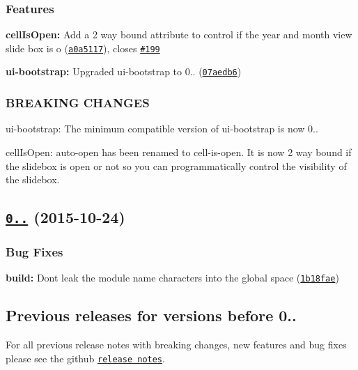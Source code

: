 \subsubsection*{Features}


\begin{DoxyItemize}
\item {\bfseries cell\+Is\+Open\+:} Add a 2 way bound attribute to control if the year and month view slide box is o (\href{https://github.com/mattlewis92/angular-bootstrap-calendar/commit/a0a5117}{\tt a0a5117}), closes \href{https://github.com/mattlewis92/angular-bootstrap-calendar/issues/199}{\tt \#199}
\item {\bfseries ui-\/bootstrap\+:} Upgraded ui-\/bootstrap to 0.. (\href{https://github.com/mattlewis92/angular-bootstrap-calendar/commit/07aedb6}{\tt 07aedb6})
\end{DoxyItemize}

\subsubsection*{B\+R\+E\+A\+K\+I\+NG C\+H\+A\+N\+G\+ES}


\begin{DoxyItemize}
\item ui-\/bootstrap\+: The minimum compatible version of ui-\/bootstrap is now 0..
\item cell\+Is\+Open\+: auto-\/open has been renamed to cell-\/is-\/open. It is now 2 way bound if the slidebox is open or not so you can programmatically control the visibility of the slidebox.
\end{DoxyItemize}

\label{_0.15.5}%
 \subsection*{\href{https://github.com/mattlewis92/angular-bootstrap-calendar/compare/0.15.4...v0.15.5}{\tt 0..} (2015-\/10-\/24)}

\subsubsection*{Bug Fixes}


\begin{DoxyItemize}
\item {\bfseries build\+:} Don\textquotesingle{}t leak the module name characters into the global space (\href{https://github.com/mattlewis92/angular-bootstrap-calendar/commit/1b18fae}{\tt 1b18fae})
\end{DoxyItemize}

\subsection*{Previous releases for versions before 0..}

For all previous release notes with breaking changes, new features and bug fixes please see the github \href{https://github.com/mattlewis92/angular-bootstrap-calendar/releases}{\tt release notes}. 